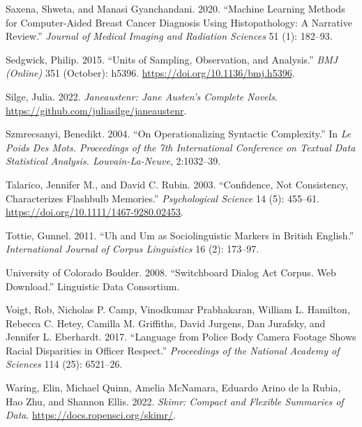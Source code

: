 \documentclass[
  letterpaper,
  DIV=11,
  numbers=noendperiod]{scrreport}
\newlength{\cslhangindent}
\newlength{\cslentryspacingunit} %
\newenvironment{CSLReferences}[2] %
 {%
  \setlength{\parindent}{0pt}
  \ifodd #1
  \let\oldpar\par
  \def\par{\hangindent=\cslhangindent\oldpar}
  \fi
  \setlength{\parskip}{#2\cslentryspacingunit}
 }%
 {}
\theoremstyle{definition}
\theoremstyle{remark}
\begin{document}
\begin{CSLReferences}{1}{0}
\leavevmode{}%
Saxena, Shweta, and Manasi Gyanchandani. 2020. {``Machine Learning
Methods for Computer-Aided Breast Cancer Diagnosis Using Histopathology:
A Narrative Review.''} \emph{Journal of Medical Imaging and Radiation
Sciences} 51 (1): 182--93.

\leavevmode{}%
Sedgwick, Philip. 2015. {``Units of Sampling, Observation, and
Analysis.''} \emph{BMJ (Online)} 351 (October): h5396.
\url{https://doi.org/10.1136/bmj.h5396}.

\leavevmode{}%
Silge, Julia. 2022. \emph{Janeaustenr: Jane Austen's Complete Novels}.
\url{https://github.com/juliasilge/janeaustenr}.

\leavevmode{}%
Szmrecsanyi, Benedikt. 2004. {``On Operationalizing Syntactic
Complexity.''} In \emph{Le Poids Des Mots. Proceedings of the 7th
International Conference on Textual Data Statistical Analysis.
Louvain-La-Neuve}, 2:1032--39.

\leavevmode{}%
Talarico, Jennifer M., and David C. Rubin. 2003. {``Confidence, Not
Consistency, Characterizes Flashbulb Memories.''} \emph{Psychological
Science} 14 (5): 455--61. \url{https://doi.org/10.1111/1467-9280.02453}.

\leavevmode{}%
Tottie, Gunnel. 2011. {``Uh and Um as Sociolinguistic Markers in British
English.''} \emph{International Journal of Corpus Linguistics} 16 (2):
173--97.

\leavevmode{}%
University of Colorado Boulder. 2008. {``Switchboard Dialog Act Corpus.
Web Download.''} Linguistic Data Consortium.

\leavevmode{}%
Voigt, Rob, Nicholas P. Camp, Vinodkumar Prabhakaran, William L.
Hamilton, Rebecca C. Hetey, Camilla M. Griffiths, David Jurgens, Dan
Jurafsky, and Jennifer L. Eberhardt. 2017. {``Language from Police Body
Camera Footage Shows Racial Disparities in Officer Respect.''}
\emph{Proceedings of the National Academy of Sciences} 114 (25):
6521--26.

\leavevmode{}%
Waring, Elin, Michael Quinn, Amelia McNamara, Eduardo Arino de la Rubia,
Hao Zhu, and Shannon Ellis. 2022. \emph{Skimr: Compact and Flexible
Summaries of Data}. \url{https://docs.ropensci.org/skimr/}.


\end{CSLReferences}
\end{document}
